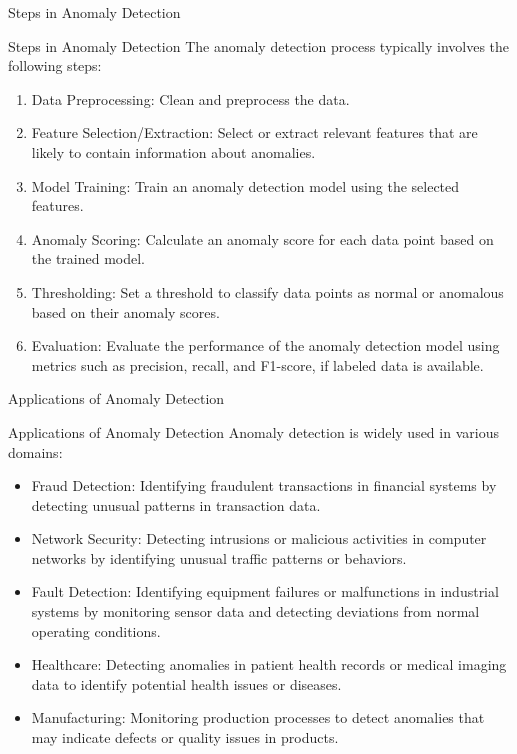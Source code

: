 \documentclass[hyperref={pdfpagelabels=false},aspectratio=169]{beamer}
\begin{document}
\begin{frame}[label={sec:org2b35283}]{Steps in Anomaly Detection}
\begin{block}{Steps in Anomaly Detection}
\pause
The anomaly detection process typically involves the following steps:
\begin{enumerate}[<+->]
\item \alert{Data Preprocessing}: Clean and preprocess the data.
\item \alert{Feature Selection/Extraction}: Select or extract relevant features that are likely to contain information about anomalies.
\item \alert{Model Training}: Train an anomaly detection model using the selected features.
\item \alert{Anomaly Scoring}: Calculate an anomaly score for each data point based on the trained model.
\item \alert{Thresholding}: Set a threshold to classify data points as normal or anomalous based on their anomaly scores.
\item \alert{Evaluation}: Evaluate the performance of the anomaly detection model using metrics such as precision, recall, and F1-score, if labeled data is available.
\end{enumerate}
\end{block}
\end{frame}
\begin{frame}[label={sec:org88fd682}]{Applications of Anomaly Detection}
\begin{block}{Applications of Anomaly Detection}
\pause
Anomaly detection is widely used in various domains:
\begin{itemize}[<+->]
\item \alert{\alert{Fraud Detection}}: Identifying fraudulent transactions in financial systems by detecting unusual patterns in transaction data.
\item \alert{\alert{Network Security}}: Detecting intrusions or malicious activities in computer networks by identifying unusual traffic patterns or behaviors.
\item \alert{\alert{Fault Detection}}: Identifying equipment failures or malfunctions in industrial systems by monitoring sensor data and detecting deviations from normal operating conditions.
\item \alert{\alert{Healthcare}}: Detecting anomalies in patient health records or medical imaging data to identify potential health issues or diseases.
\item \alert{\alert{Manufacturing}}: Monitoring production processes to detect anomalies that may indicate defects or quality issues in products.
\end{itemize}
\end{block}
\end{frame}
\end{document}
